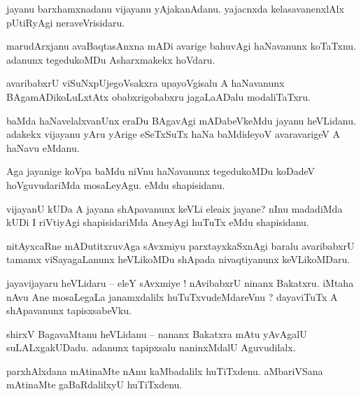 \documentclass{article}
\begin{document}
\begin{mn}%
jayanu barxhamxnadanu vijayanu yAjakanAdanu. yajacnxda kelasavanenxlAlx pUtiRyAgi neraveVrisidaru.
\end{mn}

\begin{mn}%
marudArxjanu avaBaqtasAnxna mADi avarige bahuvAgi haNavanunx koTaTxnu. adanunx tegedukoMDu 
Asharxmakekx hoVdaru.
\end{mn}

\begin{mn}%
avaribabxrU viSuNxpUjegoVsakxra upayoVgisalu A haNavanunx BAgamADikoLuLxtAtx obabxrigobabxru 
jagaLaADalu modaliTaTxru.
\end{mn}

\begin{mn}%
baMda haNavelalxvanUnx eraDu BAgavAgi mADabeVkeMdu jayanu heVLidanu. adakekx vijayanu yAru yArige 
eSeTxSuTx haNa baMdideyoV avaravarigeV A haNavu eMdanu.
\end{mn}

\begin{mn}%
Aga jayanige koVpa baMdu niVnu haNavanunx tegedukoMDu koDadeV hoVguvudariMda mosaLeyAgu. eMdu 
shapisidanu.
\end{mn}

\begin{mn}%
vijayanU kUDa A jayana shApavanunx keVLi eleaix jayane? nInu madadiMda kUDi I riVtiyAgi 
shapisidariMda AneyAgi huTuTx eMdu shapisidanu.
\end{mn}

\begin{mn}%
nitAyxcaRne mADutitxruvAga sAvxmiyu parxtayxkaSxnAgi baralu avaribabxrU tamamx viSayagaLanunx 
heVLikoMDu shApada nivaqtiyanunx keVLikoMDaru.
\end{mn}

\begin{mn}%
jayavijayaru heVLidaru -- eleY sAvxmiye ! nAvibabxrU ninanx Bakatxru. iMtaha nAvu Ane mosaLegaLa 
janamxdalilx huTuTxvudeMdareVnu ? dayaviTuTx A shApavanunx tapisxsabeVku.
\end{mn}

\begin{mn}%
shirxV BagavaMtanu heVLidanu -- nananx Bakatxra mAtu yAvAgalU suLALxgakUDadu. adanunx tapipxsalu 
naninxMdalU Aguvudilalx.
\end{mn}

\begin{mn}%
parxhAlxdana mAtinaMte nAnu kaMbadalilx huTiTxdenu. aMbariVSana mAtinaMte gaBaRdalilxyU huTiTxdenu.
\end{mn}
\end{document}
